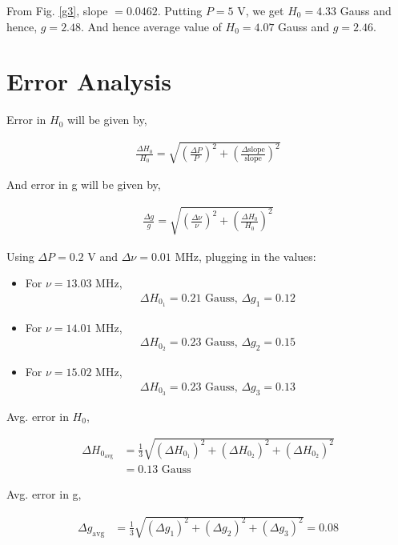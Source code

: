 From Fig. \ref{g3}, slope $= 0.0462$. Putting $P=5$ V, we get $H_0=4.33$ Gauss and hence, $g=2.48$. And hence average value of $H_0=4.07$ Gauss and $g=2.46$.

\section{Error Analysis}

Error in $H_0$ will be given by,

\begin{align}
    \frac{\Delta H_0}{H_0} = \sqrt{\left(\frac{\Delta P}{P}\right)^2 + \left(\frac{\Delta \text{slope}}{\text{slope}}\right)^2}
\end{align}

And error in g will be given by,

\begin{align}
    \frac{\Delta g}{g} = \sqrt{\left(\frac{\Delta \nu}{\nu}\right)^2 + \left(\frac{\Delta H_0}{H_0}\right)^2}
\end{align}

Using $\Delta P = 0.2$ V and $\Delta \nu = 0.01$ MHz, plugging in the values:

\begin{itemize}
    \item For $\nu=13.03$ MHz,
    \begin{align*}
        \Delta H_{0_1} = 0.21 \text{ Gauss, } \Delta g_1 = 0.12
    \end{align*}
    \item For $\nu=14.01$ MHz,
    \begin{align*}
        \Delta H_{0_2} = 0.23 \text{ Gauss, } \Delta g_2 = 0.15
    \end{align*}
    \item For $\nu=15.02$ MHz,
    \begin{align*}
        \Delta H_{0_3} = 0.23 \text{ Gauss, } \Delta g_3 = 0.13
    \end{align*}
\end{itemize}

Avg. error in $H_0$,

\begin{align*}
    \Delta H_{0_\text{avg}} &= \frac{1}{3}\sqrt{(\Delta H_{0_1})^2 + (\Delta H_{0_2})^2 + (\Delta H_{0_2})^2}\\
    &= 0.13 \text{ Gauss}
\end{align*}

Avg. error in g,

\begin{align*}
    \Delta g_\text{avg} &= \frac{1}{3}\sqrt{(\Delta g_1)^2 + (\Delta g_2)^2 + (\Delta g_3)^2}= 0.08\\
\end{align*}

